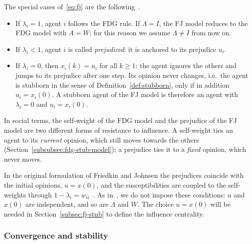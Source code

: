The special cases of~\eqref{eq:fj} are the following~\cite{proskurnikov2017tutorial}.
\begin{itemize}
  \item If $\lambda_i = 1$, agent $i$ follows the FDG rule. If $\Lambda = I$, the FJ
        model reduces to the FDG model with $A = W$; for this reason we assume
        $\Lambda \neq I$ from now on.
  \item If $\lambda_i < 1$, agent $i$ is called \emph{prejudiced}: it is anchored to its
        prejudice $u_i$.
  \item If $\lambda_i = 0$, then $x_i(k) = u_i$ for all $k \geq 1$: the agent ignores
        the others and jumps to its prejudice after one step. Its opinion never changes,
        i.e.\ the agent is stubborn in the sense of Definition~\ref{def:stubborn}, only
        if in addition $u_i = x_i(0)$. A stubborn agent of the FJ model is therefore an
        agent with $\lambda_i = 0$ and $u_i = x_i(0)$.
\end{itemize}

In social terms, the self-weight of the FDG model and the prejudice of the FJ model are
two different forms of resistance to influence. A self-weight ties an agent to its
\emph{current} opinion, which still moves towards the others
(Section~\ref{subsubsec:fdg-stub-model}); a prejudice ties it to a \emph{fixed}
opinion, which never moves.

In the original formulation of Friedkin and Johnsen the prejudices coincide with the
initial opinions, $u = x(0)$, and the susceptibilities are coupled to the self-weights
through $1 - \lambda_i = w_{ii}$~\cite{proskurnikov2017tutorial,bullo2024lns}. As
in~\cite{proskurnikov2017tutorial}, we do not impose these conditions: $u$ and $x(0)$
are independent, and so are $\Lambda$ and $W$. The choice $u = x(0)$ will be needed in
Section~\ref{subsec:fj-stub} to define the influence centrality.

\subsubsection{Convergence and stability}
\label{subsubsec:fj-conv}

